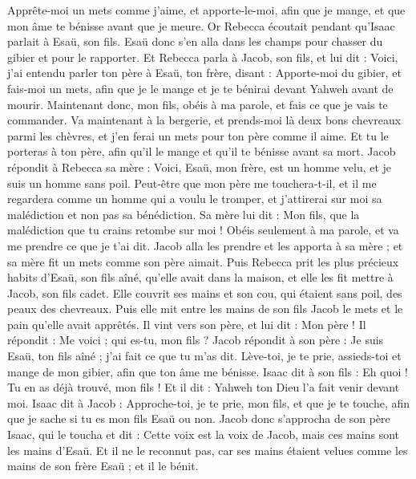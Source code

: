 \begin{multicols}{2}
Apprête-moi un mets comme j’aime, et apporte-le-moi, afin que je mange, et que mon âme te bénisse avant que je meure.
Or Rebecca écoutait pendant qu'Isaac parlait à Esaü, son fils. Esaü donc s'en alla dans les champs pour chasser du gibier et pour le rapporter.
Et Rebecca parla à Jacob, son fils, et lui dit : Voici, j'ai entendu parler ton père à Esaü, ton frère, disant :
Apporte-moi du gibier, et fais-moi un mets, afin que je le mange et je te bénirai devant Yahweh avant de mourir.
Maintenant donc, mon fils, obéis à ma parole, et fais ce que je vais te commander.
Va maintenant à la bergerie, et prends-moi là deux bons chevreaux parmi les chèvres, et j'en ferai un mets pour ton père comme il aime.
Et tu le porteras à ton père, afin qu'il le mange et qu'il te bénisse avant sa mort.
Jacob répondit à Rebecca sa mère : Voici, Esaü, mon frère, est un homme velu, et je suis un homme sans poil.
Peut-être que mon père me touchera-t-il, et il me regardera comme un homme qui a voulu le tromper, et j'attirerai sur moi sa malédiction et non pas sa bénédiction.
Sa mère lui dit : Mon fils, que la malédiction que tu crains retombe sur moi ! Obéis seulement à ma parole, et va me prendre ce que je t'ai dit.
Jacob alla les prendre et les apporta à sa mère ; et sa mère fit un mets comme son père aimait.
Puis Rebecca prit les plus précieux habits d'Esaü, son fils aîné, qu'elle avait dans la maison, et elle les fit mettre à Jacob, son fils cadet.
Elle couvrit ses mains et son cou, qui étaient sans poil, des peaux des chevreaux.
Puis elle mit entre les mains de son fils Jacob le mets et le pain qu'elle avait apprêtés.
Il vint vers son père, et lui dit : Mon père ! Il répondit : Me voici ; qui es-tu, mon fils ?
Jacob répondit à son père : Je suis Esaü, ton fils aîné ; j'ai fait ce que tu m’as dit. Lève-toi, je te prie, assieds-toi et mange de mon gibier, afin que ton âme me bénisse.
Isaac dit à son fils : Eh quoi ! Tu en as déjà trouvé, mon fils ! Et il dit : Yahweh ton Dieu l'a fait venir devant moi.
Isaac dit à Jacob : Approche-toi, je te prie, mon fils, et que je te touche, afin que je sache si tu es mon fils Esaü ou non.
Jacob donc s'approcha de son père Isaac, qui le toucha et dit : Cette voix est la voix de Jacob, mais ces mains sont les mains d'Esaü.
Et il ne le reconnut pas, car ses mains étaient velues comme les mains de son frère Esaü ; et il le bénit.

\end{multicols}
